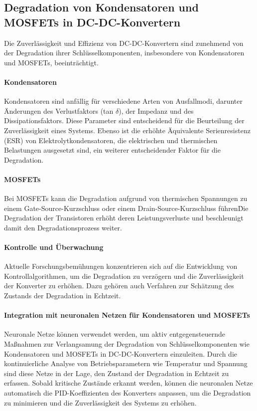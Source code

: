 \subsection{Degradation von Kondensatoren und MOSFETs in DC-DC-Konvertern}

Die Zuverlässigkeit und Effizienz von DC-DC-Konvertern sind zunehmend von der Degradation ihrer Schlüsselkomponenten, insbesondere von Kondensatoren und MOSFETs, beeinträchtigt.

\paragraph{Kondensatoren}

Kondensatoren sind anfällig für verschiedene Arten von Ausfallmodi, darunter Änderungen des Verlustfaktors (tan $\delta$), der Impedanz und des Dissipationsfaktors. Diese Parameter sind entscheidend für die Beurteilung der Zuverlässigkeit eines Systems. Ebenso ist die erhöhte Äquivalente Serienresistenz (ESR) von Elektrolytkondensatoren, die elektrischen und thermischen Belastungen ausgesetzt sind, ein weiterer entscheidender Faktor für die Degradation.\cite[pp. 1]{jeong2023degradation}

\paragraph{MOSFETs}

Bei MOSFETs kann die Degradation aufgrund von thermischen Spannungen zu einem Gate-Source-Kurzschluss oder einem Drain-Source-Kurzschluss führen\. Die Degradation der Transistoren erhöht deren Leistungsverluste und beschleunigt damit den Degradationsprozess weiter.\cite[pp. 190]{wensdesign2022}



\paragraph{Kontrolle und Überwachung}

Aktuelle Forschungsbemühungen konzentrieren sich auf die Entwicklung von Kontrollalgorithmen, um die Degradation zu verzögern und die Zuverlässigkeit der Konverter zu erhöhen. Dazu gehören auch Verfahren zur Schätzung des Zustands der Degradation in Echtzeit.
\cite[p.~24, p.~310-311]{choi2013pulsewidth}

\paragraph{Integration mit neuronalen Netzen für Kondensatoren und MOSFETs}

Neuronale Netze können verwendet werden, um aktiv entgegensteuernde Maßnahmen zur Verlangsamung der Degradation von Schlüsselkomponenten wie Kondensatoren und MOSFETs in DC-DC-Konvertern einzuleiten. Durch die kontinuierliche Analyse von Betriebsparametern wie Temperatur und Spannung sind diese Netze in der Lage, den Zustand der Degradation in Echtzeit zu erfassen. Sobald kritische Zustände erkannt werden, können die neuronalen Netze automatisch die PID-Koeffizienten des Konverters anpassen, um die Degradation zu minimieren und die Zuverlässigkeit des Systems zu erhöhen.
\cite[p.~22]{morales2020grokking}
